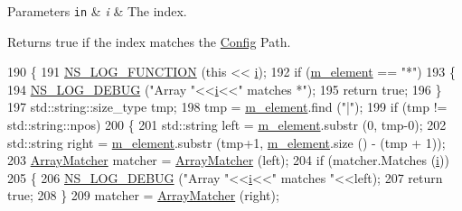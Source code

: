 \begin{DoxyParams}[1]{Parameters}
\mbox{\tt in}  & {\em i} & The index. \\
\hline
\end{DoxyParams}
\begin{DoxyReturn}{Returns}
{\ttfamily true} if the index matches the \hyperlink{namespacens3_1_1Config}{Config} Path. 
\end{DoxyReturn}

\begin{DoxyCode}
190 \{
191   \hyperlink{log-macros-disabled_8h_a90b90d5bad1f39cb1b64923ea94c0761}{NS\_LOG\_FUNCTION} (\textcolor{keyword}{this} << \hyperlink{bernuolliDistribution_8m_a6f6ccfcf58b31cb6412107d9d5281426}{i});
192   \textcolor{keywordflow}{if} (\hyperlink{classns3_1_1ArrayMatcher_ad9d28e2e5604f925a9281af1927e3749}{m\_element} == \textcolor{stringliteral}{"*"})
193     \{
194       \hyperlink{group__logging_ga413f1886406d49f59a6a0a89b77b4d0a}{NS\_LOG\_DEBUG} (\textcolor{stringliteral}{"Array "}<<\hyperlink{bernuolliDistribution_8m_a6f6ccfcf58b31cb6412107d9d5281426}{i}<<\textcolor{stringliteral}{" matches *"});
195       \textcolor{keywordflow}{return} \textcolor{keyword}{true};
196     \}
197   std::string::size\_type tmp;
198   tmp = \hyperlink{classns3_1_1ArrayMatcher_ad9d28e2e5604f925a9281af1927e3749}{m\_element}.find (\textcolor{stringliteral}{"|"});
199   \textcolor{keywordflow}{if} (tmp != std::string::npos)
200     \{
201       std::string left = \hyperlink{classns3_1_1ArrayMatcher_ad9d28e2e5604f925a9281af1927e3749}{m\_element}.substr (0, tmp-0);
202       std::string right = \hyperlink{classns3_1_1ArrayMatcher_ad9d28e2e5604f925a9281af1927e3749}{m\_element}.substr (tmp+1, \hyperlink{classns3_1_1ArrayMatcher_ad9d28e2e5604f925a9281af1927e3749}{m\_element}.size () - (tmp + 1));
203       \hyperlink{classns3_1_1ArrayMatcher_af739906ed10dd878d793ece4ac8a16f4}{ArrayMatcher} matcher = \hyperlink{classns3_1_1ArrayMatcher_af739906ed10dd878d793ece4ac8a16f4}{ArrayMatcher} (left);
204       \textcolor{keywordflow}{if} (matcher.Matches (\hyperlink{bernuolliDistribution_8m_a6f6ccfcf58b31cb6412107d9d5281426}{i}))
205         \{
206           \hyperlink{group__logging_ga413f1886406d49f59a6a0a89b77b4d0a}{NS\_LOG\_DEBUG} (\textcolor{stringliteral}{"Array "}<<\hyperlink{bernuolliDistribution_8m_a6f6ccfcf58b31cb6412107d9d5281426}{i}<<\textcolor{stringliteral}{" matches "}<<left);
207           \textcolor{keywordflow}{return} \textcolor{keyword}{true};
208         \}
209       matcher = \hyperlink{classns3_1_1ArrayMatcher_af739906ed10dd878d793ece4ac8a16f4}{ArrayMatcher} (right);

\end{DoxyCode}
